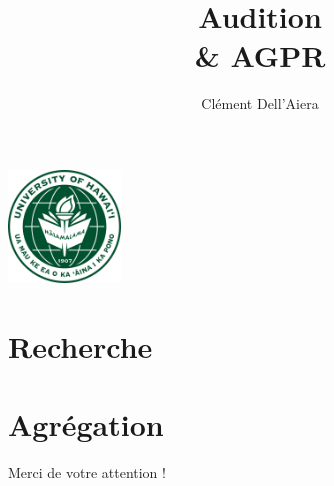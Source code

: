 \documentclass{beamer}
\title[First Steps with SCRATCH]{Audition\\ \& AGPR}
\author{Clément Dell'Aiera}
\institute{University of Hawaii at Manoa}
\date{}
\begin{document}
\begin{frame}
\titlepage
\begin{center} \includegraphics[width=3cm]{UH_logo.png}\end{center}
\end{frame}

\begin{frame}
  \tableofcontents\end{frame}

\section{Recherche}


\section{Agr\'egation}
\begin{frame}
  \tableofcontents[currentsection]
\end{frame}


\footnotesize

%
%

\Large
\begin{frame}{}
Merci de votre attention !
\end{frame}
\end{document}
